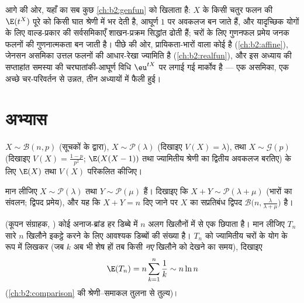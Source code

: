 \begin{remark}[इस खंड के भीतर के परिप्रेक्ष्य]
आगे की ओर, यहाँ का सब कुछ \cref{ch:b2:genfun} को खिलाता है: $X$ के किसी चतुर फलन
की  $\E(t^X)$ पूरे  को किसी घात श्रेणी में भर देती है,
आघूर्ण $1$ पर अवकलज बन जाते हैं, और यादृच्छिक योगों के लिए
वाल्ड-प्रकार की सर्वसमिकाएँ शाखन-प्रक्रम सिद्धांत ढोती हैं;
 चरों के लिए गुणनफल प्रमेय जनक फलनों की गुणनात्मकता बन जाती
है। पीछे की ओर,  प्रायिकता-भारों वाला कोई  है
(\cref{ch:b2:affine}), जेनसन असमिका उत्तल फलनों की आधार-रेखा ज्यामिति है (\cref{ch:b2:realfun}),
और इस अध्याय की सप्ताहांत समस्या की चरघातांकी-आघूर्ण विधि $\eu^{tX}$ पर
लगाई गई मार्कोव है --- एक असमिका, एक अच्छे चर-परिवर्तन से उन्नत,
तीन अध्यायों में फैली हुई।
\end{remark}

\section{अभ्यास}

\begin{exercise}[$\star$]\label{exo:b2:randomvar:1}
$X \sim \mathcal{B}(n, p)$ (सूचकों के द्वारा), $X \sim \mathcal{P}(\lambda)$ (दिखाइए $V(X) =
\lambda$), तथा $X \sim \mathcal{G}(p)$ (दिखाइए $V(X) =
\frac{1-p}{p^2}$;
$\E(X(X-1))$ तथा ज्यामितीय श्रेणी का द्वितीय अवकलज बरतिए) के लिए $\E(X)$ तथा
$V(X)$ परिकलित कीजिए।
\end{exercise}

\begin{exercise}[$\star$]\label{exo:b2:randomvar:2}
मान लीजिए $X \sim \mathcal{P}(\lambda)$ तथा $Y \sim \mathcal{P}(\mu)$  हैं। दिखाइए कि $X + Y \sim \mathcal{P}(\lambda + \mu)$ (भारों का
संवलन; द्विपद प्रमेय), और यह कि $X + Y = n$ दिए जाने पर $X$ का सप्रतिबंध
 द्विपद $\mathcal{B}\bigl(n, \frac{\lambda}{\lambda + \mu}\bigr)$ है।
\end{exercise}

\begin{exercise}[$\star$]\label{exo:b2:randomvar:3}
(कूपन संग्राहक, ) कोई अनाज-ब्रांड हर डिब्बे में $n$ अलग
खिलौनों में से एक  छिपाता है। मान लीजिए $T_n$ सारे $n$
खिलौने इकट्ठे करने के लिए आवश्यक डिब्बों की संख्या है। $T_n$ को
 ज्यामितीय चरों के योग के रूप में लिखकर (जब $k$ अब भी शेष
हों तब किसी \emph{नए} खिलौने को देखने का समय), दिखाइए
\[
\E(T_n) = n\sum_{k=1}^{n}\frac{1}{k} \sim n\ln n
\]
(\cref{ch:b2:comparison} की श्रेणी--समाकल तुलना से तुल्य)।
\end{exercise}

